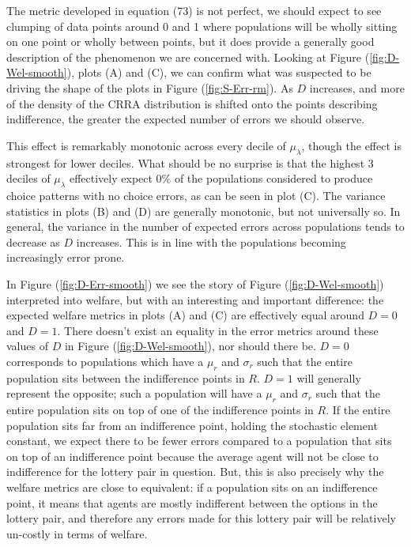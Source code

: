 \documentclass[../main.tex]{subfiles}
\begin{document}
The metric developed in equation (73) is not perfect, we should expect to see clumping of data points around 0 and 1 where populations will be wholly sitting on one point or wholly between points, but it does provide a generally good description of the phenomenon we are concerned with.
Looking at Figure (\ref{fig:D-Wel-smooth}), plots (A) and (C), we can confirm what was suspected to be driving the shape of the plots in Figure (\ref{fig:S-Err-rm}).
As $D$ increases, and more of the density of the CRRA distribution is shifted onto the points describing indifference, the greater the expected number of errors we should observe.

This effect is remarkably monotonic across every decile of $\mu_\lambda$, though the effect is strongest for lower deciles.
What should be no surprise is that the highest 3 deciles of $\mu_\lambda$ effectively expect $0\%$ of the populations considered to produce choice patterns with no choice errors, as can be seen in plot (C).
The variance statistics in plots (B) and (D) are generally monotonic, but not universally so.
In general, the variance in the number of expected errors across populations tends to decrease as $D$ increases.
This is in line with the populations becoming increasingly error prone.

In Figure (\ref{fig:D-Err-smooth}) we see the story of Figure (\ref{fig:D-Wel-smooth}) interpreted into welfare, but with an interesting and important difference: the expected welfare metrics in plots (A) and (C) are effectively equal around $D=0$ and $D=1$.
There doesn't exist an equality in the error metrics around these values of $D$ in Figure (\ref{fig:D-Wel-smooth}), nor should there be.
$D=0$ corresponds to populations which have a $\mu_r$ and $\sigma_r$ such that the entire population sits between the indifference points in $R$.
$D=1$ will generally{\footnotemark} represent the opposite; such a population will have a $\mu_r$ and $\sigma_r$ such that the entire population sits on top of one of the indifference points in $R$.
If the entire population sits far from an indifference point, holding the stochastic element constant, we expect there to be fewer errors compared to a population that sits on top of an indifference point because the average agent will not be close to indifference for the lottery pair in question.
But, this is also precisely why the welfare metrics are close to equivalent: if a population sits on an indifference point, it means that agents are mostly indifferent between the options in the lottery pair, and therefore any errors made for this lottery pair will be relatively un-costly in terms of welfare.
\end{document}
